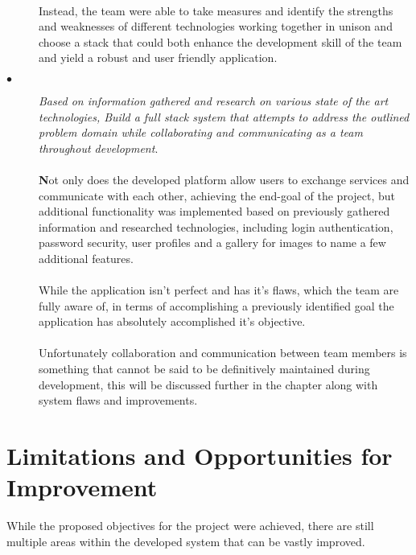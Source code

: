 \begin{description}
  \paragraph{}
  Instead, the team were able to take measures and identify the strengths and weaknesses of different technologies working together in unison and choose a stack that could both enhance the development skill of the team and yield a robust and user friendly application.
  
  \item[$\bullet$] \textit{Based on information gathered and research on various state of the art technologies, Build a full stack system that attempts to address the outlined problem domain while collaborating and communicating as a team throughout development}. 

  \paragraph{}
  \textbf{N}ot only does the developed platform allow users to exchange services and communicate with each other, achieving the end-goal of the project, but additional functionality was implemented based on previously gathered information and researched technologies, including login authentication, password security, user profiles and a gallery for images to name a few additional features.
  
  \paragraph{}
  While the application isn't perfect and has it's flaws, which the team are fully aware of, in terms of accomplishing a previously identified goal the application has absolutely accomplished it's objective. 
  
  \paragraph{}
  Unfortunately collaboration and communication between team members is something that cannot be said to be definitively maintained during development, this will be discussed further in the chapter along with system flaws and improvements.
\end{description}

\section{Limitations and Opportunities for Improvement}
While the proposed objectives for the project were achieved, there are still multiple areas within the developed system that can be vastly improved.

